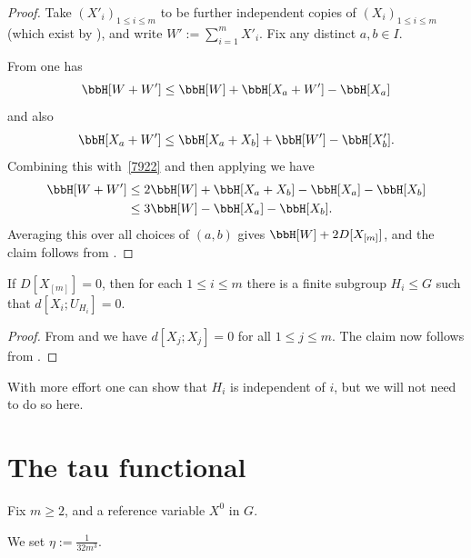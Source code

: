 \begin{proof}\leanok
  Take $(X'_i)_{1 \leq i \leq m}$ to be further independent copies of $(X_i)_{1 \leq i \leq m}$ (which exist by ), and write $W' := \sum_{i=1}^m X'_i$.
  Fix any distinct $a,b \in I$.

  From  one has
  \begin{equation}\label{7922}
    \bbH[W + W'] \leq  \bbH[W] + \bbH[X_{a} + W'] - \bbH[X_{a}]
   \end{equation}
   and also
   \[ \bbH[X_a + W'] \leq \bbH[X_a + X_b] + \bbH[W'] - \bbH[X'_b].\]
   Combining this with~\eqref{7922} and then applying  we have
   \begin{align*}  \bbH[W + W']  & \leq    2\bbH[W] + \bbH[X_a + X_b]  - \bbH[X_a] - \bbH[X_b] \\ & \leq
    3 \bbH[W] - \bbH[X_a] - \bbH[X_b].
  \end{align*}
  Averaging this over all choices of $(a,b)$ gives $\bbH[W] + 2 D[X_{[m]}]$, and the claim follows from .
\end{proof}

\begin{proposition}[Vanishing]\label{multi-zero}\leanok
If $D[X_{[m]}]=0$, then for each $1 \leq i \leq m$ there is a finite subgroup $H_i \leq G$ such that $d[X_i; U_{H_i}] = 0$.
\end{proposition}

\begin{proof}\leanok  From  and  we have $d[X_j; X_j]=0$ for all $1 \leq j \leq m$.  The claim now follows from .
\end{proof}

With more effort one can show that $H_i$ is independent of $i$, but we will not need to do so here.

\section{The tau functional}

Fix $m \geq 2$, and a reference variable $X^0$ in $G$.

\begin{definition}[$\eta$]\label{eta-def-multi}\leanok
We set $\eta := \frac{1}{32m^3}$.
\end{definition}

